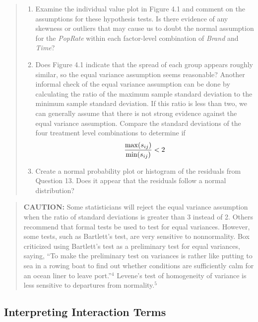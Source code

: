 \documentclass[
]{book}
\providecommand{\tightlist}{%
  \setlength{\itemsep}{0pt}\setlength{\parskip}{0pt}}
\begin{document}
\begin{quote}
\begin{enumerate}
\def\labelenumi{\alph{enumi}.}
\tightlist
\item
  Examine the individual value plot in Figure 4.1 and comment on the assumptions for these hypothesis tests. Is there evidence of any skewness or outliers that may cause us to doubt the normal assumption for the \emph{PopRate} within each factor-level combination of \emph{Brand} and \emph{Time}?
\item
  Does Figure 4.1 indicate that the spread of each group appears roughly similar, so the equal variance assumption seems reasonable? Another informal check of the equal variance assumption can be done by calculating the ratio of the maximum sample standard deviation to the minimum sample standard deviation. If this ratio is less than two, we can generally assume that there is not strong evidence against the equal variance assumption. Compare the standard deviations of the four treatment level combinations to determine if
  \begin{align}
  \frac{\max(s_{ij})}{\min(s_{ij})} < 2
  \notag
  \end{align}
\item
  Create a normal probability plot or histogram of the residuals from Question 13. Does it appear that the residuals follow a normal distribution?
\end{enumerate}
\end{quote}

\begin{quote}
\textbf{CAUTION:} Some statisticians will reject the equal variance assumption when the ratio of standard deviations is greater than 3 instead of 2. Others recommend that formal tests be used to test for equal variances. However, some tests, such as Bartlett's test, are very sensitive to nonnormality. Box criticized using Bartlett's test as a preliminary test for equal variances, saying, ``To make the preliminary test on variances is rather like putting to sea in a rowing boat to find out whether conditions are sufficiently calm for an ocean liner to leave port.''\(^4\) Levene's test of homogeneity of variance is less sensitive to departures from normality.\(^5\)
\end{quote}

\hypertarget{interpreting-interaction-terms}{%
\subsection*{Interpreting Interaction Terms}\label{interpreting-interaction-terms}}
\end{document}

